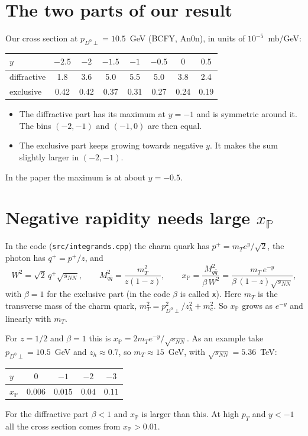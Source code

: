 \documentclass[11pt]{article}
\begin{document}
\section{The two parts of our result}

Our cross section at $p_{D^0\perp}=10.5$~GeV (BCFY, An0n), in units of
$10^{-5}$~mb/GeV:
\begin{center}
\begin{tabular}{lccccccc}
\toprule
$y$ & $-2.5$ & $-2$ & $-1.5$ & $-1$ & $-0.5$ & $0$ & $0.5$ \\
\midrule
diffractive & 1.8 & 3.6 & 5.0 & 5.5 & 5.0 & 3.8 & 2.4 \\
exclusive   & 0.42 & 0.42 & 0.37 & 0.31 & 0.27 & 0.24 & 0.19 \\
\bottomrule
\end{tabular}
\end{center}
\begin{itemize}
  \item The diffractive part has its maximum at $y=-1$ and is symmetric around
    it. The bins $(-2,-1)$ and $(-1,0)$ are then equal.
  \item The exclusive part keeps growing towards negative $y$. It makes the
    sum slightly larger in $(-2,-1)$.
\end{itemize}
In the paper the maximum is at about $y=-0.5$.

\section{Negative rapidity needs large $x_\mathbb{P}$}

In the code (\texttt{src/integrands.cpp}) the charm quark has
$p^+=m_T e^{y}/\sqrt2$, the photon has $q^+=p^+/z$, and
\begin{equation}
  W^2=\sqrt2\,q^+\sqrt{s_{NN}}, \qquad
  M_{q\bar q}^2=\frac{m_T^2}{z(1-z)}, \qquad
  x_\mathbb{P}=\frac{M_{q\bar q}^2}{\beta\,W^2}
  =\frac{m_T\,e^{-y}}{\beta\,(1-z)\sqrt{s_{NN}}} ,
\end{equation}
with $\beta=1$ for the exclusive part (in the code $\beta$ is called
\texttt{x}). Here $m_T$ is the transverse mass of the charm quark,
$m_T^2=p_{D^0\perp}^2/z_h^2+m_c^2$. So $x_\mathbb{P}$ grows as $e^{-y}$ and
linearly with $m_T$.

For $z=1/2$ and $\beta=1$ this is $x_\mathbb{P}=2m_Te^{-y}/\sqrt{s_{NN}}$. As
an example take $p_{D^0\perp}=10.5$~GeV and $z_h\approx0.7$, so
$m_T\approx15$~GeV, with $\sqrt{s_{NN}}=5.36$~TeV:
\begin{center}
\begin{tabular}{lcccc}
\toprule
$y$ & $0$ & $-1$ & $-2$ & $-3$ \\
\midrule
$x_\mathbb{P}$ & $0.006$ & $0.015$ & $0.04$ & $0.11$ \\
\bottomrule
\end{tabular}
\end{center}
For the diffractive part $\beta<1$ and $x_\mathbb{P}$ is larger than this.
At high $p_T$ and $y<-1$ all the cross section comes from
$x_\mathbb{P}>0.01$.
\end{document}
